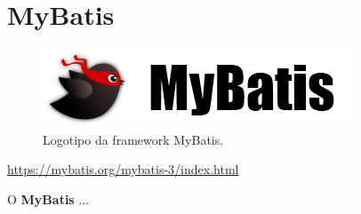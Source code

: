 \section{MyBatis}
\label{subsec:mybatis}

\begin{figure}[H]
    \centering
    \includegraphics[scale=0.45]{images/mybatis.png}
    \caption{Logotipo da framework MyBatis.}
    \label{fig:mybatis}
\end{figure}

\href{https://mybatis.org/mybatis-3/index.html}{https://mybatis.org/mybatis-3/index.html}

\hspace{5mm} O \textbf{MyBatis} ...